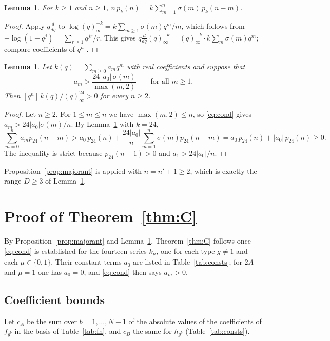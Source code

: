 \documentclass[11pt]{amsart}
\newtheorem{lemma}[theorem]{Lemma}
\theoremstyle{definition}
\begin{document}
\begin{lemma}\label{lem:partitions}
For $k\ge1$ and $n\ge1$, $n\,p_k(n)=k\sum_{m=1}^n\sigma(m)\,p_k(n-m)$.
\end{lemma}

\begin{proof}
Apply $q\frac{d}{dq}$ to $\log(q)_\infty^{-k}=k\sum_{m\ge1}\sigma(m)q^m/m$, which follows from $-\log(1-q^j)=\sum_{r\ge1}q^{jr}/r$. This gives $q\frac{d}{dq}(q)^{-k}_\infty=(q)_\infty^{-k}\cdot k\sum_m\sigma(m)q^m$; compare coefficients of $q^n$ \cite[Chapter~1]{And84}.
\end{proof}

\begin{lemma}\label{lem:positivity}
Let $k(q)=\sum_{m\ge0}a_mq^m$ with real coefficients and suppose that
\begin{equation}\label{eq:cond}
a_m>\frac{24\,|a_0|\,\sigma(m)}{\max(m,2)}\qquad\text{for all }m\ge1 .
\end{equation}
Then $[q^n]\,k(q)/(q)_\infty^{24}>0$ for every $n\ge2$.
\end{lemma}

\begin{proof}
Let $n\ge2$. For $1\le m\le n$ we have $\max(m,2)\le n$, so \eqref{eq:cond} gives $a_m>24|a_0|\sigma(m)/n$. By Lemma~\ref{lem:partitions} with $k=24$,
\[
\sum_{m=0}^na_mp_{24}(n-m)>a_0\,p_{24}(n)+\frac{24|a_0|}{n}\sum_{m=1}^n\sigma(m)p_{24}(n-m)=a_0\,p_{24}(n)+|a_0|\,p_{24}(n)\ge0 .
\]
The inequality is strict because $p_{24}(n-1)>0$ and $a_1>24|a_0|/n$.
\end{proof}

Proposition~\ref{prop:majorant} is applied with $n=n'+1\ge2$, which is exactly the range $D\ge3$ of Lemma~\ref{lem:positivity}.

\section{Proof of Theorem~\ref{thm:C}}\label{sec:proofC}

By Proposition~\ref{prop:majorant} and Lemma~\ref{lem:positivity}, Theorem~\ref{thm:C} follows once \eqref{eq:cond} is established for the fourteen series $k_\mu$, one for each type $g\ne1$ and each $\mu\in\{0,1\}$. Their constant terms $a_0$ are listed in Table~\ref{tab:consts}; for $2A$ and $\mu=1$ one has $a_0=0$, and \eqref{eq:cond} then says $a_m>0$.

\subsection{Coefficient bounds}
Let $c_A$ be the sum over $b=1,\dots,N-1$ of the absolute values of the coefficients of $f_{g^b}$ in the basis of Table~\ref{tab:fh}, and $c_B$ the same for $h_{g^b}$ (Table~\ref{tab:consts}).
\end{document}
